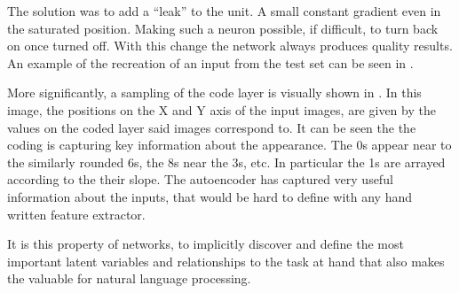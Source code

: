 \documentclass[12pt,parskip]{komatufte}
\begin{document}
The solution was to add a ``leak'' to the unit.
A small constant gradient even in the saturated position.
Making such a neuron possible, if difficult, to turn back on once turned off.
With this change the network always produces quality results.
An example of the recreation of an input from the test set can be seen in 
 . 




More significantly, a sampling of the code layer is visually shown in .
In this image, the positions on the X and Y axis of the input images, are given by the values on the coded layer said images correspond to.
It can be seen the the coding is capturing key information about the appearance.
The 0s appear near to the similarly rounded 6s,
the 8s near the 3s, etc.
In particular the 1s are arrayed according to the their slope.
The autoencoder has captured very useful information about the inputs, that would be hard to define with any hand written feature extractor.

It is this property of networks, to implicitly discover and define the most important latent variables and relationships to the task at hand that also makes the valuable for natural language processing.
\end{document}
